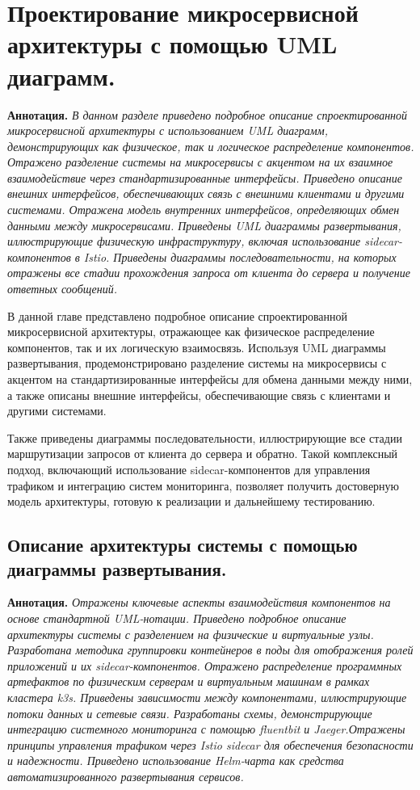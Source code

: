 \chapter{Проектирование микросервисной архитектуры с помощью UML диаграмм. }
\textbf{Аннотация.} \textit{В данном разделе приведено подробное описание спроектированной микросервисной архитектуры с использованием UML диаграмм, демонстрирующих как физическое, так и логическое распределение компонентов. Отражено разделение системы на микросервисы с акцентом на их взаимное взаимодействие через стандартизированные интерфейсы. Приведено описание внешних интерфейсов, обеспечивающих связь с внешними клиентами и другими системами. Отражена модель внутренних интерфейсов, определяющих обмен данными между микросервисами. Приведены UML диаграммы развертывания, иллюстрирующие физическую инфраструктуру, включая использование sidecar-компонентов в Istio. Приведены диаграммы последовательности, на которых отражены все стадии прохождения запроса от клиента до сервера и получение ответных сообщений.}

В данной главе представлено подробное описание спроектированной микросервисной архитектуры, отражающее как физическое распределение компонентов, так и их логическую взаимосвязь. Используя UML диаграммы развертывания, продемонстрировано разделение системы на микросервисы с акцентом на стандартизированные интерфейсы для обмена данными между ними, а также описаны внешние интерфейсы, обеспечивающие связь с клиентами и другими системами.

Также приведены диаграммы последовательности, иллюстрирующие все стадии маршрутизации запросов от клиента до сервера и обратно. Такой комплексный подход, включающий использование sidecar-компонентов для управления трафиком и интеграцию систем мониторинга, позволяет получить достоверную модель архитектуры, готовую к реализации и дальнейшему тестированию.


\section{Описание архитектуры системы с помощью диаграммы развертывания.}
\textbf{Аннотация.} \textit{Отражены ключевые аспекты взаимодействия компонентов на основе стандартной UML-нотации. Приведено подробное описание архитектуры системы с разделением на физические и виртуальные узлы. Разработана методика группировки контейнеров в поды для отображения ролей приложений и их sidecar-компонентов. Отражено распределение программных артефактов по физическим серверам и виртуальным машинам в рамках кластера k3s. Приведены зависимости между компонентами, иллюстрирующие потоки данных и сетевые связи. Разработаны схемы, демонстрирующие интеграцию системного мониторинга с помощью fluentbit и Jaeger.Отражены принципы управления трафиком через Istio sidecar для обеспечения безопасности и надежности. Приведено использование Helm-чарта как средства автоматизированного развертывания сервисов. }


